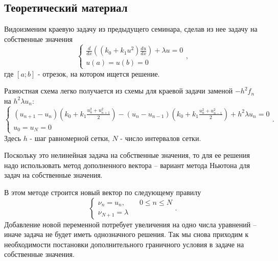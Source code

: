 \chapter{}

\section{Теоретический материал}
Видоизменим краевую задачу из предыдущего семинара, сделав из нее задачу на собственные значения
\begin{equation} \label{c6eq1}
	\begin{cases}
		 \displaystyle \frac{d}{dx} \left( \left( k_0 + k_1 u^2 \right) \frac{du}{dx} \right) + \lambda u = 0 \\
		u(a) = u(b) = 0
	\end{cases},
\end{equation}
где $[a; b]$ - отрезок, на котором ищется решение.

Разностная схема легко получается из схемы для краевой задачи заменой $-h^2 f_n$ на $h^2 \lambda u_n$:
\begin{equation} \label{c6eq2}
	\begin{cases}
		\displaystyle \left( u_{n+1} - u_n \right) \left( k_0 + k_1 \frac{u_n^2 + u_{n+1}^2}{2} \right) - \left( u_n - u_{n-1} \right) \left( k_0 + k_1 \frac{u_n^2 + u_{n-1}^2}{2} \right) + h^2 \lambda u_n = 0 \\
		u_0 = u_N = 0
	\end{cases}.
\end{equation}
Здесь $h$ - шаг равномерной сетки, $N$ - число интервалов сетки.

Поскольку это нелинейная задача на собственные значения, то для ее решения надо использовать метод дополненного вектора – вариант метода Ньютона для задач на собственные значения.

В этом методе строится новый вектор   по следующему правилу
\begin{equation} \label{c6eq3}
	\begin{cases}
	\nu_n = u_n, \qquad 0 \leq n \leq N\\
	\nu_{N+1} = \lambda
	\end{cases}.
\end{equation}
Добавление новой переменной потребует увеличения на одно числа уравнений – иначе задача не будет иметь однозначного решения. Так мы снова приходим к необходимости постановки дополнительного граничного условия в задаче на собственные значения.

